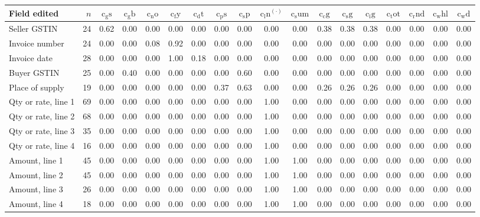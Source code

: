 \begin{tabular}{lrcccccccccccccccc}
\toprule
Field edited & $n$ & $\mathrm{c_gs}$ & $\mathrm{c_gb}$ & $\mathrm{c_no}$ & $\mathrm{c_fy}$ & $\mathrm{c_dt}$ & $\mathrm{c_ps}$ & $\mathrm{c_sp}$ & $\mathrm{c_ln}^{(\cdot)}$ & $\mathrm{c_sum}$ & $\mathrm{c_cg}$ & $\mathrm{c_sg}$ & $\mathrm{c_ig}$ & $\mathrm{c_tot}$ & $\mathrm{c_rnd}$ & $\mathrm{c_whl}$ & $\mathrm{c_wd}$\\
\midrule
Seller GSTIN & 24 & 0.62 & 0.00 & 0.00 & 0.00 & 0.00 & 0.00 & 0.00 & 0.00 & 0.00 & 0.38 & 0.38 & 0.38 & 0.00 & 0.00 & 0.00 & 0.00\\
Invoice number & 24 & 0.00 & 0.00 & 0.08 & 0.92 & 0.00 & 0.00 & 0.00 & 0.00 & 0.00 & 0.00 & 0.00 & 0.00 & 0.00 & 0.00 & 0.00 & 0.00\\
Invoice date & 28 & 0.00 & 0.00 & 0.00 & 1.00 & 0.18 & 0.00 & 0.00 & 0.00 & 0.00 & 0.00 & 0.00 & 0.00 & 0.00 & 0.00 & 0.00 & 0.00\\
Buyer GSTIN & 25 & 0.00 & 0.40 & 0.00 & 0.00 & 0.00 & 0.00 & 0.60 & 0.00 & 0.00 & 0.00 & 0.00 & 0.00 & 0.00 & 0.00 & 0.00 & 0.00\\
Place of supply & 19 & 0.00 & 0.00 & 0.00 & 0.00 & 0.00 & 0.37 & 0.63 & 0.00 & 0.00 & 0.26 & 0.26 & 0.26 & 0.00 & 0.00 & 0.00 & 0.00\\
Qty or rate, line 1 & 69 & 0.00 & 0.00 & 0.00 & 0.00 & 0.00 & 0.00 & 0.00 & 1.00 & 0.00 & 0.00 & 0.00 & 0.00 & 0.00 & 0.00 & 0.00 & 0.00\\
Qty or rate, line 2 & 68 & 0.00 & 0.00 & 0.00 & 0.00 & 0.00 & 0.00 & 0.00 & 1.00 & 0.00 & 0.00 & 0.00 & 0.00 & 0.00 & 0.00 & 0.00 & 0.00\\
Qty or rate, line 3 & 35 & 0.00 & 0.00 & 0.00 & 0.00 & 0.00 & 0.00 & 0.00 & 1.00 & 0.00 & 0.00 & 0.00 & 0.00 & 0.00 & 0.00 & 0.00 & 0.00\\
Qty or rate, line 4 & 16 & 0.00 & 0.00 & 0.00 & 0.00 & 0.00 & 0.00 & 0.00 & 1.00 & 0.00 & 0.00 & 0.00 & 0.00 & 0.00 & 0.00 & 0.00 & 0.00\\
Amount, line 1 & 45 & 0.00 & 0.00 & 0.00 & 0.00 & 0.00 & 0.00 & 0.00 & 1.00 & 1.00 & 0.00 & 0.00 & 0.00 & 0.00 & 0.00 & 0.00 & 0.00\\
Amount, line 2 & 45 & 0.00 & 0.00 & 0.00 & 0.00 & 0.00 & 0.00 & 0.00 & 1.00 & 1.00 & 0.00 & 0.00 & 0.00 & 0.00 & 0.00 & 0.00 & 0.00\\
Amount, line 3 & 26 & 0.00 & 0.00 & 0.00 & 0.00 & 0.00 & 0.00 & 0.00 & 1.00 & 1.00 & 0.00 & 0.00 & 0.00 & 0.00 & 0.00 & 0.00 & 0.00\\
Amount, line 4 & 18 & 0.00 & 0.00 & 0.00 & 0.00 & 0.00 & 0.00 & 0.00 & 1.00 & 1.00 & 0.00 & 0.00 & 0.00 & 0.00 & 0.00 & 0.00 & 0.00\\

\end{tabular}
